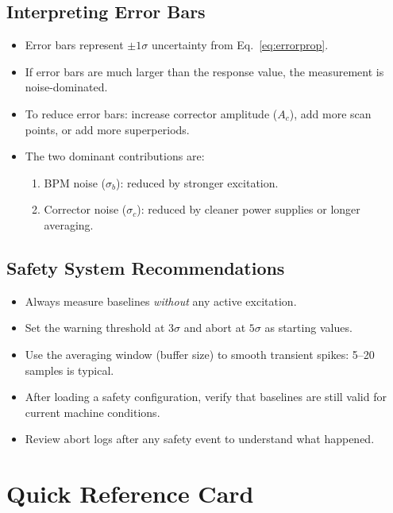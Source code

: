 \documentclass[11pt,a4paper,twoside]{report}
\begin{document}
\section{Interpreting Error Bars}

\begin{itemize}
  \item Error bars represent $\pm1\sigma$ uncertainty from Eq.~\ref{eq:errorprop}.
  \item If error bars are much larger than the response value, the measurement is noise-dominated.
  \item To reduce error bars: increase corrector amplitude ($A_c$), add more scan points, or add more superperiods.
  \item The two dominant contributions are:
    \begin{enumerate}
      \item BPM noise ($\sigma_b$): reduced by stronger excitation.
      \item Corrector noise ($\sigma_c$): reduced by cleaner power supplies or longer averaging.
    \end{enumerate}
\end{itemize}

\section{Safety System Recommendations}

\begin{warnbox}
\begin{itemize}
  \item Always measure baselines \emph{without} any active excitation.
  \item Set the warning threshold at $3\sigma$ and abort at $5\sigma$ as starting values.
  \item Use the averaging window (buffer size) to smooth transient spikes: 5--20 samples is typical.
  \item After loading a safety configuration, verify that baselines are still valid for current machine conditions.
  \item Review abort logs after any safety event to understand what happened.
\end{itemize}
\end{warnbox}


\appendix
\chapter{Quick Reference Card}\label{app:quickref}
\end{document}
